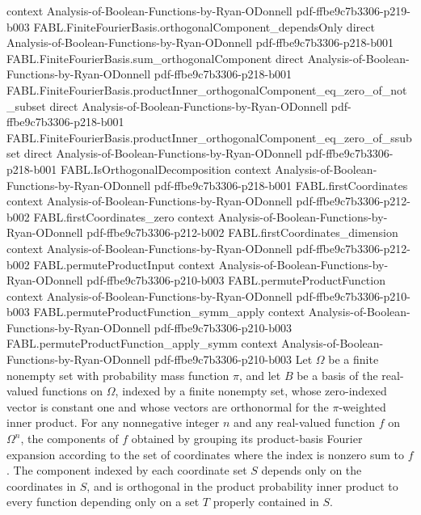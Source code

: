 \begin{theorem}
  {context}
  {Analysis-of-Boolean-Functions-by-Ryan-ODonnell}
  {pdf-ffbe9c7b3306-p219-b003}
\proofstep
  {FABL.FiniteFourierBasis.orthogonalComponent_dependsOnly}
  {direct}
  {Analysis-of-Boolean-Functions-by-Ryan-ODonnell}
  {pdf-ffbe9c7b3306-p218-b001}
\proofstep
  {FABL.FiniteFourierBasis.sum_orthogonalComponent}
  {direct}
  {Analysis-of-Boolean-Functions-by-Ryan-ODonnell}
  {pdf-ffbe9c7b3306-p218-b001}
\proofstep
  {FABL.FiniteFourierBasis.productInner_orthogonalComponent_eq_zero_of_not_subset}
  {direct}
  {Analysis-of-Boolean-Functions-by-Ryan-ODonnell}
  {pdf-ffbe9c7b3306-p218-b001}
\proofstep
  {FABL.FiniteFourierBasis.productInner_orthogonalComponent_eq_zero_of_ssubset}
  {direct}
  {Analysis-of-Boolean-Functions-by-Ryan-ODonnell}
  {pdf-ffbe9c7b3306-p218-b001}
\proofstep
  {FABL.IsOrthogonalDecomposition}
  {context}
  {Analysis-of-Boolean-Functions-by-Ryan-ODonnell}
  {pdf-ffbe9c7b3306-p218-b001}
\proofstep
  {FABL.firstCoordinates}
  {context}
  {Analysis-of-Boolean-Functions-by-Ryan-ODonnell}
  {pdf-ffbe9c7b3306-p212-b002}
\proofstep
  {FABL.firstCoordinates_zero}
  {context}
  {Analysis-of-Boolean-Functions-by-Ryan-ODonnell}
  {pdf-ffbe9c7b3306-p212-b002}
\proofstep
  {FABL.firstCoordinates_dimension}
  {context}
  {Analysis-of-Boolean-Functions-by-Ryan-ODonnell}
  {pdf-ffbe9c7b3306-p212-b002}
\proofstep
  {FABL.permuteProductInput}
  {context}
  {Analysis-of-Boolean-Functions-by-Ryan-ODonnell}
  {pdf-ffbe9c7b3306-p210-b003}
\proofstep
  {FABL.permuteProductFunction}
  {context}
  {Analysis-of-Boolean-Functions-by-Ryan-ODonnell}
  {pdf-ffbe9c7b3306-p210-b003}
\proofstep
  {FABL.permuteProductFunction_symm_apply}
  {context}
  {Analysis-of-Boolean-Functions-by-Ryan-ODonnell}
  {pdf-ffbe9c7b3306-p210-b003}
\proofstep
  {FABL.permuteProductFunction_apply_symm}
  {context}
  {Analysis-of-Boolean-Functions-by-Ryan-ODonnell}
  {pdf-ffbe9c7b3306-p210-b003}
Let $\Omega$ be a finite nonempty set with probability mass function $\pi$, and let $B$
be a basis of the real-valued functions on $\Omega$, indexed by a finite nonempty set,
whose zero-indexed vector is constant one and whose vectors are orthonormal for the
$\pi$-weighted inner product. For any nonnegative integer $n$ and any real-valued
function $f$ on $\Omega^n$, the components of $f$ obtained by grouping its product-basis
Fourier expansion according to the set of coordinates where the index is nonzero sum to
$f$. The component indexed by each coordinate set $S$ depends only on the coordinates in
$S$, and is orthogonal in the product probability inner product to every function
depending only on a set $T$ properly contained in $S$.
\end{theorem}

